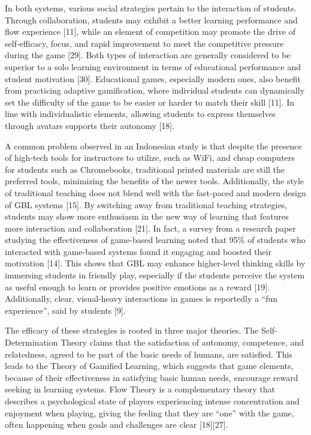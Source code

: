 In both systems, various social strategies pertain to the interaction of students. Through collaboration, students may exhibit a better 
learning performance and flow experience [11], while an element of competition may promote the drive of self-efficacy, focus,  and rapid 
improvement to meet the competitive pressure during the game [29]. Both types of interaction are generally considered to be superior to a 
solo learning environment in terms of educational performance and student motivation [30]. Educational games, especially modern ones, also
benefit from practicing adaptive gamification, where individual students can dynamically set the difficulty of the game to be easier or 
harder to match their skill [11]. In line with individualistic elements, allowing students to express themselves through avatars supports 
their autonomy [18].

A common problem observed in an Indonesian study is that despite the presence of high-tech tools for instructors to utilize, such as 
WiFi, and cheap computers for students such as Chromebooks, traditional printed materials are still the preferred tools, minimizing the 
benefits of the newer tools. Additionally, the style of traditional teaching does not blend well with the fast-paced and modern design of 
GBL systems [15]. By switching away from traditional teaching strategies, students may show more enthusiasm in the new way of learning 
that features more interaction and collaboration [21]. In fact, a survey from a research paper studying the effectiveness of game-based 
learning noted that 95\% of students who interacted with game-based systems found it engaging and boosted their motivation [14]. 
This shows that GBL may enhance higher-level thinking skills by immersing students in friendly play, especially if the students perceive 
the system as useful enough to learn or provides positive emotions as a reward [19]. Additionally, clear, visual-heavy interactions in 
games is reportedly a “fun experience”, said by students [9].

The efficacy of these strategies is rooted in three major theories. The Self-Determination Theory claims that the satisfaction of 
autonomy, competence, and relatedness, agreed to be part of the basic needs of humans, are satisfied. This leads to the Theory of 
Gamified Learning, which suggests that game elements, because of their effectiveness in satisfying basic human needs, encourage reward 
seeking in learning systems. Flow Theory is a complementary theory that describes a psychological state of players experiencing intense 
concentration and enjoyment when playing, giving the feeling that they are “one” with the game, often happening when goals and challenges 
are clear [18][27].

